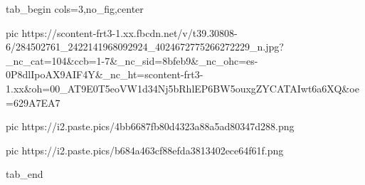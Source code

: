  
 
 
 
 


\ifcmt
  tab_begin cols=3,no_fig,center

     pic https://scontent-frt3-1.xx.fbcdn.net/v/t39.30808-6/284502761_2422141968092924_4024672775266272229_n.jpg?_nc_cat=104&ccb=1-7&_nc_sid=8bfeb9&_nc_ohc=es-0P8dlIpoAX9AIF4Y&_nc_ht=scontent-frt3-1.xx&oh=00_AT9E0T5eoVW1d34Nj5bRhlEP6BW5ouxgZYCATAIwt6a6XQ&oe=629A7EA7

		 pic https://i2.paste.pics/4bb6687fb80d4323a88a5ad80347d288.png

		 pic https://i2.paste.pics/b684a463cf88efda3813402ece64f61f.png

  tab_end
\fi
